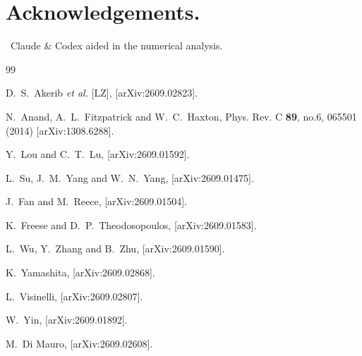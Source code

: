 \documentclass[notitlepage,floats,aps,nofootinbib,preprintnumbers,twocolumn,prl,10pt,balancelastpage]{revtex4-1}
\begin{document}
\section{Acknowledgements.}~Claude \& Codex aided in the numerical analysis.



\begin{thebibliography}{99}

D.~S.~Akerib \textit{et al.} [LZ],
[arXiv:2609.02823].


N.~Anand, A.~L.~Fitzpatrick and W.~C.~Haxton,
Phys. Rev. C \textbf{89}, no.6, 065501 (2014)
[arXiv:1308.6288].

Y.~Lou and C.~T.~Lu,
[arXiv:2609.01592].


L.~Su, J.~M.~Yang and W.~N.~Yang,
[arXiv:2609.01475].


J.~Fan and M.~Reece,
[arXiv:2609.01504].

K.~Freese and D.~P.~Theodosopoulos,
[arXiv:2609.01583].

L.~Wu, Y.~Zhang and B.~Zhu,
[arXiv:2609.01590].

K.~Yamashita,
[arXiv:2609.02868].

L.~Visinelli,
[arXiv:2609.02807].

W.~Yin,
[arXiv:2609.01892].

M.~Di Mauro,
[arXiv:2609.02608].


\end{thebibliography}
\end{document}
